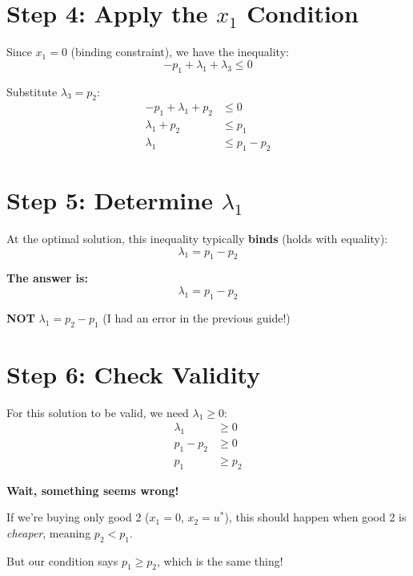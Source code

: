 \documentclass[11pt]{article}
\begin{document}
\section{Step 4: Apply the $x_1$ Condition}

Since $x_1 = 0$ (binding constraint), we have the inequality:
\begin{equation}
-p_1 + \lambda_1 + \lambda_3 \leq 0
\end{equation}

Substitute $\lambda_3 = p_2$:
\begin{align}
-p_1 + \lambda_1 + p_2 &\leq 0 \\
\lambda_1 + p_2 &\leq p_1 \\
\lambda_1 &\leq p_1 - p_2
\end{align}

\section{Step 5: Determine $\lambda_1$}

At the optimal solution, this inequality typically \textbf{binds} (holds with equality):
\begin{equation}
\lambda_1 = p_1 - p_2
\end{equation}

\begin{tcolorbox}[colback=yellow!10!white,colframe=orange!75!black,title=Important!]
\textbf{The answer is:}
$$\lambda_1 = p_1 - p_2$$

\textbf{NOT} $\lambda_1 = p_2 - p_1$ (I had an error in the previous guide!)
\end{tcolorbox}

\section{Step 6: Check Validity}

For this solution to be valid, we need $\lambda_1 \geq 0$:
\begin{align}
\lambda_1 &\geq 0 \\
p_1 - p_2 &\geq 0 \\
p_1 &\geq p_2
\end{align}

\textbf{Wait, something seems wrong!}

If we're buying only good 2 ($x_1 = 0$, $x_2 = u^*$), this should happen when good 2 is \textit{cheaper}, meaning $p_2 < p_1$.

But our condition says $p_1 \geq p_2$, which is the same thing!
\end{document}

